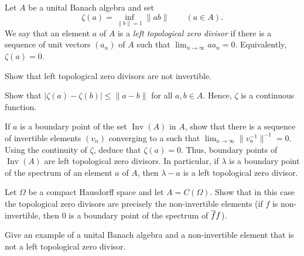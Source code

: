 \documentclass{../solution}
\DeclareMathOperator{\Inv}{Inv}
\begin{document}
\begin{prb}
Let $A$ be a unital Banach algebra and set
\[\zeta(a)=\inf_{\|b\|=1}\|ab\|\qquad(a\in A).\]
We say that an element $a$ of $A$ is a \emph{left topological zero divisor} if there is a sequence of unit vectors $(a_n)$ of $A$ such that $\lim_{n\to\infty}aa_n=0$.
Equivalently, $\zeta(a)=0$.
\begin{parts}
\item
Show that left topological zero divisors are not invertible.
\item
Show that $|\zeta(a)-\zeta(b)|\le\|a-b\|$ for all $a,b\in A$.
Hence, $\zeta$ is a continuous function.
\item
If $a$ is a boundary point of the set $\Inv(A)$ in $A$, show that there is a sequence of invertible elements $(v_n)$ converging to a such that $\lim_{n\to\infty}\|v_n^{-1}\|^{-1}=0$.
Using the continuity of $\zeta$, deduce that $\zeta(a)=0$.
Thus, boundary points of $\Inv(A)$ are left topological zero divisors.
In particular, if $\lambda$ is a boundary point of the spectrum of an element $a$ of $A$, then $\lambda-a$ is a left topological zero divisor.
\item
Let $\Omega$ be a compact Hausdorff space and let $A=C(\Omega)$.
Show that in this case the topological zero divisors are precisely the non-invertible elements (if $f$ is non-invertible, then 0 is a boundary point of the spectrum of $\overline ff$).
\item
Give an example of a unital Banach algebra and a non-invertible element that is not a left topological zero divisor.
\end{parts}
\end{prb}
\end{document}
